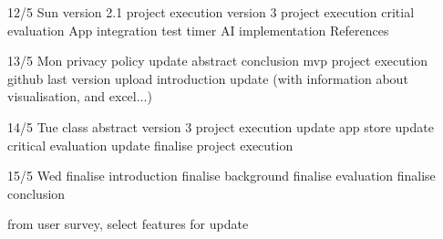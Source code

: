 12/5 Sun
version 2.1 project execution
version 3 project execution
critial evaluation
App integration test
timer
AI implementation
References


13/5 Mon
privacy policy update
abstract
conclusion
mvp project execution
github last version upload
introduction update (with information about visualisation, and excel...)


14/5 Tue
class abstract
version 3 project execution update
app store update
critical evaluation update
finalise project execution

15/5 Wed
finalise introduction
finalise background
finalise evaluation
finalise conclusion



from user survey, select features for update
